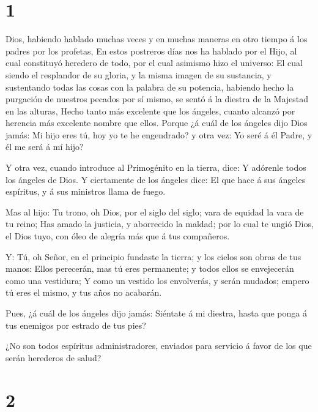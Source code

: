 \hypertarget{section}{%
\section{1}\label{section}}

 Dios, habiendo hablado muchas veces y en muchas maneras en
otro tiempo á los padres por los profetas,  En estos
postreros días nos ha hablado por el Hijo, al cual constituyó heredero
de todo, por el cual asimismo hizo el universo:  El cual
siendo el resplandor de su gloria, y la misma imagen de su sustancia, y
sustentando todas las cosas con la palabra de su potencia, habiendo
hecho la purgación de nuestros pecados por sí mismo, se sentó á la
diestra de la Majestad en las alturas,  Hecho tanto más
excelente que los ángeles, cuanto alcanzó por herencia más excelente
nombre que ellos.  Porque ¿á cuál de los ángeles dijo Dios
jamás: Mi hijo eres tú, hoy yo te he engendrado? y otra vez: Yo seré á
él Padre, y él me será á mí hijo?

 Y otra vez, cuando introduce al Primogénito en la tierra,
dice: Y adórenle todos los ángeles de Dios.  Y ciertamente
de los ángeles dice: El que hace á sus ángeles espíritus, y á sus
ministros llama de fuego.

 Mas al hijo: Tu trono, oh Dios, por el siglo del siglo;
vara de equidad la vara de tu reino;  Has amado la justicia,
y aborrecido la maldad; por lo cual te ungió Dios, el Dios tuyo, con
óleo de alegría más que á tus compañeros.

 Y: Tú, oh Señor, en el principio fundaste la tierra; y los
cielos son obras de tus manos:  Ellos perecerán, mas tú
eres permanente; y todos ellos se envejecerán como una vestidura;
 Y como un vestido los envolverás, y serán mudados; empero
tú eres el mismo, y tus años no acabarán.

 Pues, ¿á cuál de los ángeles dijo jamás: Siéntate á mi
diestra, hasta que ponga á tus enemigos por estrado de tus pies?

 ¿No son todos espíritus administradores, enviados para
servicio á favor de los que serán herederos de salud?

\hypertarget{section-1}{%
\section{2}\label{section-1}}

